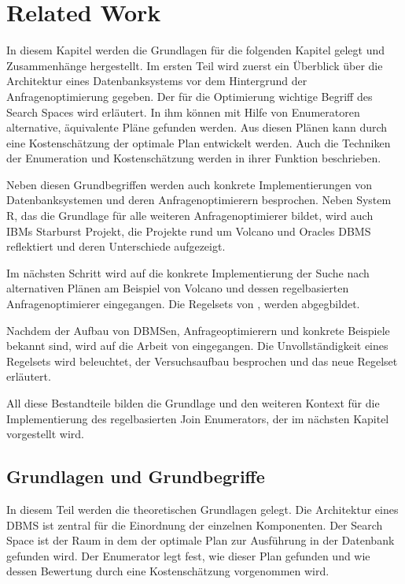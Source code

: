 \chapter{Related Work}


In diesem Kapitel werden die Grundlagen für die folgenden Kapitel gelegt und Zusammenhänge hergestellt. Im ersten Teil wird zuerst ein Überblick über die Architektur eines Datenbanksystems vor dem Hintergrund der Anfragenoptimierung gegeben. Der für die Optimierung wichtige Begriff des Search Spaces wird erläutert. In ihm können mit Hilfe von Enumeratoren alternative, äquivalente Pläne gefunden werden. Aus diesen Plänen kann  durch eine Kostenschätzung der optimale Plan entwickelt werden. Auch die Techniken der Enumeration und Kostenschätzung werden in ihrer Funktion beschrieben.

Neben diesen Grundbegriffen werden auch konkrete Implementierungen von Datenbanksystemen und deren Anfragenoptimierern besprochen. Neben System R, das die Grundlage für alle weiteren Anfragenoptimierer bildet, wird auch IBMs Starburst Projekt, die Projekte rund um Volcano und Oracles DBMS reflektiert und deren Unterschiede aufgezeigt.

Im nächsten Schritt wird auf die konkrete Implementierung der Suche nach alternativen Plänen am Beispiel von Volcano und dessen regelbasierten Anfragenoptimierer eingegangen. Die Regelsets von \cite{pellenkoft1997complexity}, \cite{pellenkoft1997duplicate} werden abgegbildet.

Nachdem der Aufbau von DBMSen, Anfrageoptimierern und konkrete Beispiele bekannt sind, wird auf die Arbeit von \cite{shanbhag2014optimizing} eingegangen. Die Unvollständigkeit eines Regelsets wird beleuchtet, der Versuchsaufbau besprochen und das neue Regelset erläutert.

All diese Bestandteile bilden die Grundlage und den weiteren Kontext für die Implementierung des regelbasierten Join Enumerators, der im nächsten Kapitel vorgestellt wird.






\section{Grundlagen und Grundbegriffe}

In diesem Teil werden die theoretischen Grundlagen gelegt. Die Architektur eines DBMS ist zentral für die Einordnung der einzelnen Komponenten. Der Search Space ist der Raum in dem der optimale Plan zur Ausführung in der Datenbank gefunden wird. Der Enumerator legt fest, wie dieser Plan gefunden und wie  dessen Bewertung durch eine Kostenschätzung vorgenommen wird.


